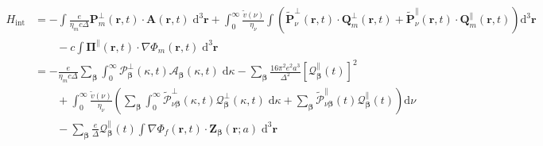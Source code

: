 \documentclass{article}
\begin{document}
\begin{equation}
\begin{split}
H_\mathrm{int} &= -\int\frac{e}{\eta_mc\Delta}\mathbf{P}_m^\perp(\mathbf{r},t)\cdot\mathbf{A}(\mathbf{r},t)\;\mathrm{d}^3\mathbf{r} + \int_0^\infty\frac{\tilde{v}(\nu)}{\eta_\nu}\int\left(\tilde{\mathbf{P}}_\nu^\perp(\mathbf{r},t)\cdot\mathbf{Q}_m^\perp(\mathbf{r},t) + \tilde{\mathbf{P}}_\nu^\parallel(\mathbf{r},t)\cdot\mathbf{Q}_m^\parallel(\mathbf{r},t)\right)\mathrm{d}^3\mathbf{r}\\
&\qquad - c\int\bm{\Pi}^\parallel(\mathbf{r},t)\cdot\nabla\Phi_m(\mathbf{r},t)\;\mathrm{d}^3\mathbf{r}\\
&= -\frac{e}{\eta_mc\Delta}\sum_{\bm{\beta}}\int_0^\infty\mathcal{P}_{\bm{\beta}}^\perp(\kappa,t)\mathcal{A}_{\bm{\beta}}(\kappa,t)\;\mathrm{d}\kappa - \sum_{\bm{\beta}}\frac{16\pi^2 e^2a^3}{\Delta^2}\left[\mathcal{Q}_{\bm{\beta}}^\parallel(t)\right]^2\\
&\qquad + \int_0^\infty\frac{\tilde{v}(\nu)}{\eta_\nu}\left(\sum_{\bm{\beta}}\int_0^\infty\tilde{\mathcal{P}}_{\nu\bm{\beta}}^\perp(\kappa,t)\mathcal{Q}_{\bm{\beta}}^\perp(\kappa,t)\;\mathrm{d}\kappa + \sum_{\bm{\beta}}\tilde{\mathcal{P}}_{\nu\bm{\beta}}^\parallel(t)\mathcal{Q}_{\bm{\beta}}^\parallel(t)\right)\mathrm{d}\nu\\
&\qquad - \sum_{\bm{\beta}}\frac{e}{\Delta}\mathcal{Q}_{\bm{\beta}}^\parallel(t)\int\nabla\Phi_f(\mathbf{r},t)\cdot\mathbf{Z}_{\bm{\beta}}(\mathbf{r};a)\;\mathrm{d}^3\mathbf{r}
\end{split}
\end{equation}
\end{document}
